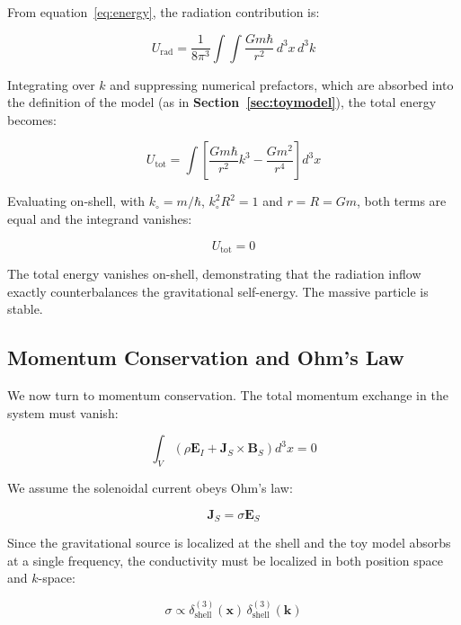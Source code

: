 \documentclass {article}
\renewcommand\vec{\mathbf}
\begin{document}
From equation~\eqref{eq:energy},  the radiation contribution is:

\begin{equation*}
U_{\text{rad}} = \frac{1}{8\pi^3} \int \int \frac{Gm\hbar}{r^2} \, d^3x \, d^3k
\end{equation*}

Integrating over $k$ and suppressing numerical prefactors, which are absorbed into the definition of the model (as in \textbf{Section~\ref{sec:toymodel}}), the total energy becomes:

\begin{equation}
U_{\text{tot}} = \int \left[ \frac{Gm\hbar}{r^2} k^3 - \frac{Gm^2}{r^4} \right] d^3x
\end{equation}

Evaluating on-shell, with $k_{\circ} = m/\hbar$,  $k_{\circ}^2 R^2 = 1$  and $r = R = Gm$, both terms are equal and the integrand vanishes:

\begin{equation}
U_{\text{tot}} = 0
\end{equation}

The total energy vanishes on-shell, demonstrating that the radiation inflow exactly counterbalances the gravitational self-energy. The massive particle is stable.

\subsection{Momentum Conservation and Ohm's Law}
\label{sec:ohm}

We now turn to momentum conservation. The total momentum exchange in the system must vanish:

\begin{equation}
\int_V \left( \rho \vec{E}_I + \vec{J}_S \times \vec{B}_S \right) d^3x = 0
\end{equation}

We assume the solenoidal current obeys Ohm's law:

\begin{equation}
\vec{J}_S = \sigma \vec{E}_S
\end{equation}

\noindent Since the gravitational source is localized at the shell and the toy model absorbs at a single frequency, the conductivity must be localized in both position space and $k$-space:

\begin{equation}
\sigma \propto \delta^{(3)}_{\text{shell}}(\vec{x})\, \delta^{(3)}_{\text{shell}}(\vec{k})
\end{equation}
\end{document}
